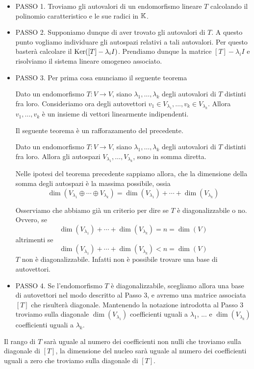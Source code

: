 \begin{itemize}
	\item PASSO 1. Troviamo gli autovalori di un endomorfismo lineare $T$ calcolando il polinomio
	      caratteristico e le sue radici in $\mathbb{K}$.
	\item PASSO 2. Supponiamo dunque di aver trovato gli autovalori di $T$. A questo punto
	      vogliamo individuare gli autospazi relativi a tali autovalori.
	      Per questo basterà calcolare il $\operatorname{Ker}([T] - \lambda_i I)$. Prendiamo dunque la
	      matrice $[T] - \lambda_i I$ e risolviamo il sistema lineare omogeneo associato.
	\item PASSO 3. Per prima cosa enunciamo il seguente teorema
	      \begin{theorem}
		      Dato un endomorfismo $T : V \to V$, siano $\lambda_1, \dots, \lambda_k$
		      degli autovalori di $T$ distinti fra loro. Consideriamo ora degli autovettori
		      $v_1 \in V_{\lambda_1}, \dots, v_k \in V_{\lambda_k}$. Allora
		      $v_1, \dots, v_k$ è un insieme di vettori linearmente indipendenti.
	      \end{theorem}

	      Il seguente teorema è un rafforazamento del precedente.
	      \begin{theorem}
		      Dato un endomorfismo $T : V \to V$, siano $\lambda_1, \dots, \lambda_k$ degli
		      autovalori di $T$ distinti fra loro. Allora gli autospazi
		      $V_{\lambda_1}, \dots, V_{\lambda_k}$, sono in somma diretta.
	      \end{theorem}

	      Nelle ipotesi del teorema precedente sappiamo allora, che la dimensione della somma
	      degli autospazi è la massima possibile, ossia
	      \[
		      \dim(V_{\lambda_1} \oplus \cdots \oplus V_{\lambda_k}) = \dim(V_{\lambda_1}) +
		      \cdots + \dim(V_{\lambda_k})
	      \]

	      Osserviamo che abbiamo già un criterio per dire se $T$ è diagonalizzabile o no.
	      Ovvero, se
	      \[
		      \dim(V_{\lambda_1}) + \cdots + \dim(V_{\lambda_k}) = n = \dim(V)
	      \]
	      altrimenti se
	      \[
		      \dim(V_{\lambda_1}) + \cdots + \dim(V_{\lambda_k}) < n = \dim(V)
	      \]
	      $T$ non è diagonalizzabile. Infatti non è possibile trovare una base di
	      autovettori.
	\item PASSO 4. Se l'endomorfismo $T$ è diagonalizzabile, scegliamo allora una base di
	      autovettori nel modo descritto al Passo 3, e avremo una matrice associata $[T]$ che
	      risulterà diagonale. Mantenendo la notazione introdotta al Passo 3 troviamo sulla
	      diagonale $\dim(V_{\lambda_1})$ coefficienti uguali a
	      $\lambda_1$, ... e $\dim(V_{\lambda_k})$ coefficienti uguali a $\lambda_k$.
\end{itemize}
Il rango di $T$ sarà uguale al numero dei coefficienti non nulli che troviamo
sulla diagonale di $[T]$, la dimensione del nucleo sarà uguale al numero dei
coefficienti uguali a zero che troviamo sulla diagonale di $[T]$.

